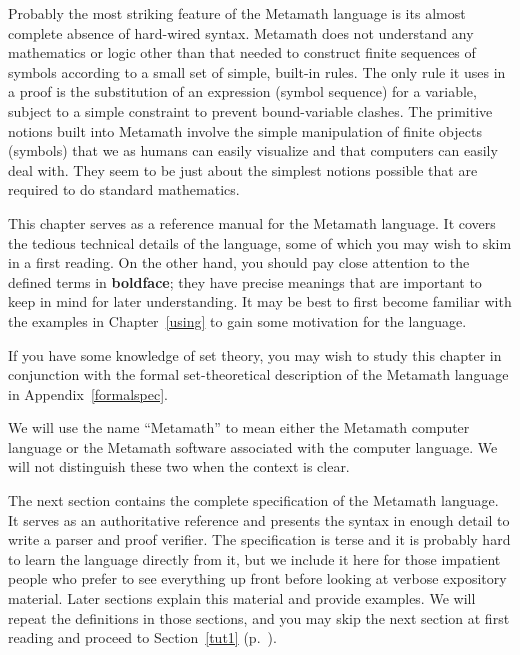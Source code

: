 Probably the most striking feature of the Metamath language is its almost
complete absence of hard-wired syntax. Metamath does not
understand any mathematics or logic other than that needed to construct finite
sequences of symbols according to a small set of simple, built-in rules.  The
only rule it uses in a proof is the substitution of an expression (symbol
sequence) for a variable, subject to a simple constraint to prevent
bound-variable clashes.  The primitive notions built into Metamath involve the
simple manipulation of finite objects (symbols) that we as humans can easily
visualize and that computers can easily deal with.  They seem to be just
about the simplest notions possible that are required to do standard
mathematics.

This chapter serves as a reference manual for the Metamath
language. It covers the tedious technical details of the language, some of
which you may wish to skim in a first reading.  On the other hand, you should
pay close attention to the defined terms in {\bf boldface}; they have precise
meanings that are important to keep in mind for later understanding.  It may
be best to first become familiar with the examples in Chapter~\ref{using} to
gain some motivation for the language.

If you have some knowledge of set theory, you may wish to study this
chapter in conjunction with the formal set-theoretical description of the
Metamath language in Appendix~\ref{formalspec}.

We will use the name ``Metamath'' to mean either the Metamath
computer language or the Metamath software associated with the computer
language.  We will not distinguish these two when the context is clear.

The next section contains the complete specification of the Metamath
language.
It serves as an
authoritative reference and presents the syntax in enough detail to
write a parser and proof verifier.  The
specification is terse and it is probably hard to learn the language
directly from it, but we include it here for those impatient people who
prefer to see everything up front before looking at verbose expository
material.  Later sections explain this material and provide examples.
We will repeat the definitions in those sections, and you may skip the
next section at first reading and proceed to Section~\ref{tut1}
(p.~\pageref{tut1}).

